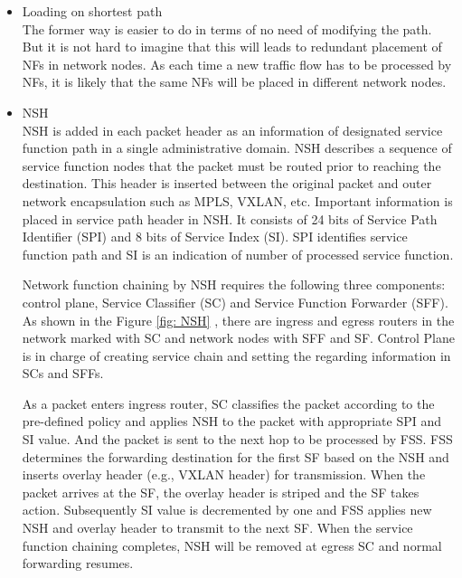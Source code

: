 	\begin{itemize}
		\item Loading on shortest path\\
			The former way is easier to do in terms of no need of modifying the path. But it is not hard to imagine that this will leads to redundant placement of NFs in network nodes. As each time a new traffic flow has to be processed by NFs, it is likely that the same NFs will be placed in different network nodes. 
		\item NSH\\
			NSH is added in each packet header as an information of designated service function path in a single administrative domain. NSH describes a sequence of service function nodes that the packet must be routed prior to reaching the destination. This header is inserted between the original packet and outer network encapsulation such as MPLS, VXLAN, etc. Important information is placed in service path header in NSH. It consists of 24 bits of Service Path Identifier (SPI) and 8 bits of Service Index (SI). SPI identifies service function path and SI is an indication of number of processed service function. 
			
			Network function chaining by NSH requires the following three components: control plane, Service Classifier (SC) and Service Function Forwarder (SFF). As shown in the Figure \ref{fig: NSH} , there are ingress and egress routers in the network marked with SC and network nodes with SFF and SF. Control Plane is in charge of creating service chain and setting the regarding information in SCs and SFFs. 
			
			As a packet enters ingress router, SC classifies the packet according to the pre-defined policy and applies NSH to the packet with appropriate SPI and SI value. And the packet is sent to the next hop to be processed by FSS. FSS determines the forwarding destination for the first SF based on the NSH and inserts overlay header (e.g., VXLAN header) for transmission. When the packet arrives at the SF, the overlay header is striped and the SF takes action. Subsequently SI value is decremented by one and FSS applies new NSH and overlay header to transmit to the next SF. When the service function chaining completes, NSH will be removed at egress SC and normal forwarding resumes.   
			

\end{itemize}
